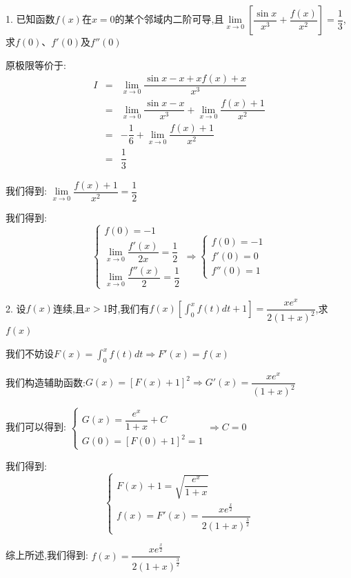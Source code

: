 1. 已知函数$f(x)$在$x=0$的某个邻域内二阶可导,且$\lim\limits_{x\rightarrow 0 }\left[ \dfrac{\sin x}{x^3}+\dfrac{f(x)}{x^2}\right]=\dfrac{1}{3}$,求$f(0)$、$f'(0)$及$f''(0)$
\begin{solution}

	原极限等价于:  
	\begin{eqnarray*}
		I&=&\lim\limits_{x\rightarrow 0 } \dfrac{\sin x-x+xf(x)+x}{x^3}\\
		&=&\lim\limits_{x\rightarrow 0 } \dfrac{\sin x-x}{x^3}+\lim\limits_{x\rightarrow 0 } \dfrac{f(x)+1}{x^2}\\
		&=&-\dfrac{1}{6}+\lim\limits_{x\rightarrow 0 } \dfrac{f(x)+1}{x^2}\\
		&=&\dfrac{1}{3}
	\end{eqnarray*}

	我们得到:  $\lim\limits_{x\rightarrow 0 } \dfrac{f(x)+1}{x^2}=\dfrac{1}{2}$
	
	我们得到:  
	$$\left\lbrace
	\begin{array}{l}
		f(0)=-1\\
		\lim\limits_{x\rightarrow 0}\dfrac{f'(x)}{2x}=\dfrac{1}{2}\\
		\lim\limits_{x\rightarrow 0}\dfrac{f''(x)}{2}=\dfrac{1}{2}
	\end{array}
	\right. \Rightarrow \left\lbrace
	\begin{array}{l}
		f(0)=-1\\
		f'(0)=0\\
		f''(0)=1
	\end{array}
	\right. $$
\end{solution}

2. 设$f(x)$连续,且$x>1$时,我们有$f(x)\left[ \int_{0}^{x}f(t)dt+1\right]=\dfrac{xe^x}{2(1+x)^2}$,求$f(x)$
\begin{solution}

	我们不妨设$F(x)=\int_{0}^{x}f(t)dt\Rightarrow F'(x)=f(x)$
	
	我们构造辅助函数:$G(x)=\left[F(x)+1\right]^2\Rightarrow G'(x)=\dfrac{xe^x}{(1+x)^2}$
	
	我们可以得到:  $\left\lbrace
	\begin{array}{l}
		G(x)=\dfrac{e^x}{1+x}+C\\ G(0)=[F(0)+1]^2=1
	\end{array}
	\right. \Rightarrow C=0$
	
	我们得到:  $$\left\lbrace
	\begin{array}{l}
		F(x)+1=\sqrt{\dfrac{e^x}{1+x}}\\
		f(x)=F'(x)=\dfrac{xe^{\frac{x}{2}}}{2(1+x)^{\frac{3}{2}}}
	\end{array}
	\right. $$
	
	综上所述,我们得到:  $f(x)=\dfrac{xe^{\frac{x}{2}}}{2(1+x)^{\frac{3}{2}}}$
\end{solution}

